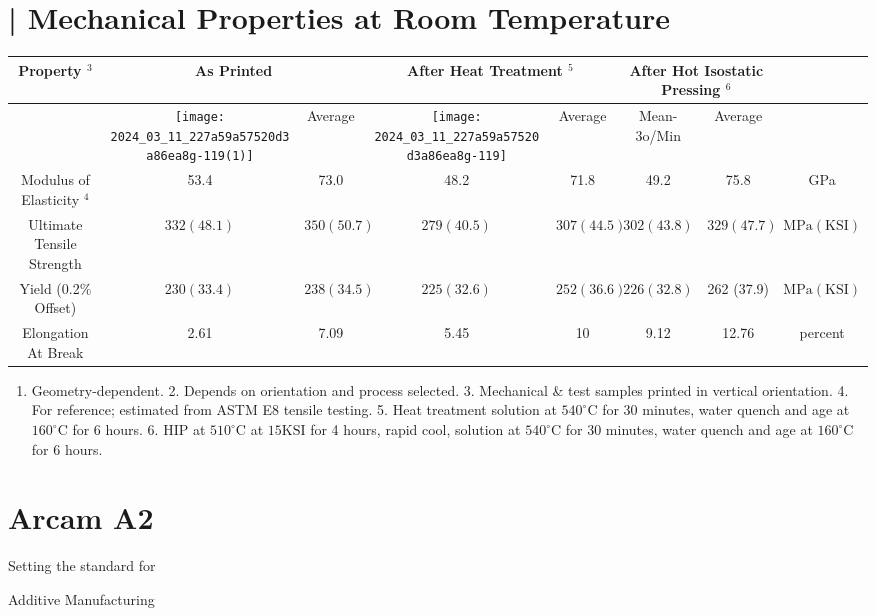 \documentclass[10pt]{article}
\begin{document}
\section*{| Mechanical Properties at Room Temperature}
\begin{center}
\begin{tabular}{|c|c|c|c|c|c|c|c|}
\hline
\multirow[b]{2}{*}{Property $^{3}$} & \multicolumn{2}{|c|}{As Printed} & \multicolumn{2}{|c|}{After Heat Treatment ${ }^{5}$} & \multicolumn{2}{|c|}{After Hot Isostatic Pressing ${ }^{6}$} &  \\
\hline
 & \texttt{[image: 2024\_03\_11\_227a59a57520d3a86ea8g-119(1)]}
 & Average & \texttt{[image: 2024\_03\_11\_227a59a57520d3a86ea8g-119]}
 & Average & Mean-3o/Min & Average &  \\
\hline
Modulus of Elasticity ${ }^{4}$ & 53.4 & 73.0 & 48.2 & 71.8 & 49.2 & 75.8 & GPa \\
\hline
Ultimate Tensile Strength & $332(48.1)$ & $350(50.7)$ & $279(40.5)$ & $307(44.5)$ & $302(43.8)$ & $329(47.7)$ & $\mathrm{MPa}(\mathrm{KSI})$ \\
\hline
Yield (0.2\% Offset) & $230(33.4)$ & $238(34.5)$ & $225(32.6)$ & $252(36.6)$ & $226(32.8)$ & 262 (37.9) & $\mathrm{MPa}(\mathrm{KSI})$ \\
\hline
Elongation At Break & 2.61 & 7.09 & 5.45 & 10 & 9.12 & 12.76 & percent \\
\hline
\end{tabular}
\end{center}

\begin{enumerate}
  \item Geometry-dependent. 2. Depends on orientation and process selected. 3. Mechanical \& test samples printed in vertical orientation. 4. For reference; estimated from ASTM E8 tensile testing. 5. Heat treatment solution at $540^{\circ} \mathrm{C}$ for 30 minutes, water quench and age at $160^{\circ} \mathrm{C}$ for 6 hours. 6. HIP at $510^{\circ} \mathrm{C}$ at $15 \mathrm{KSI}$ for 4 hours, rapid cool, solution at $540^{\circ} \mathrm{C}$ for 30 minutes, water quench and age at $160^{\circ} \mathrm{C}$ for 6 hours.
\end{enumerate}

\section*{Arcam A2}
Setting the standard for

Additive Manufacturing
\end{document}
